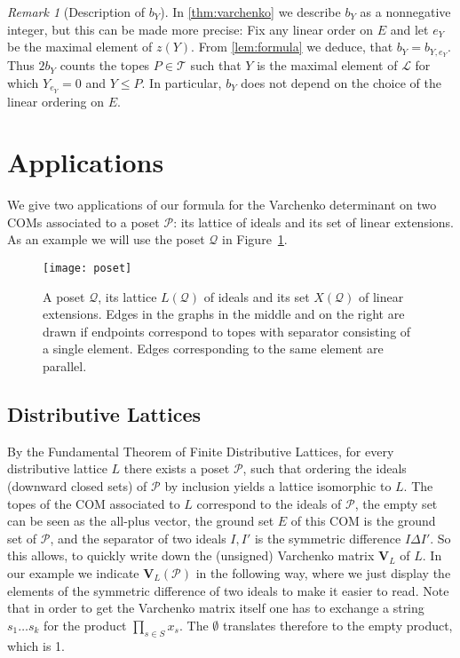 \documentclass[12pt]{amsart}
\def\Tscr{{\mathcal T}}
\theoremstyle{plain}
\numberwithin{Lemma}{\DefaultNumberTheoremWithin}
\numberwithin{Claim}{\DefaultNumberTheoremWithin}
\numberwithin{Theorem}{\DefaultNumberTheoremWithin}
\numberwithin{Corollary}{\DefaultNumberTheoremWithin}
\numberwithin{Proposition}{\DefaultNumberTheoremWithin}
\numberwithin{Conjecture}{\DefaultNumberTheoremWithin}
\numberwithin{Situation}{\DefaultNumberTheoremWithin}
\numberwithin{Note}{\DefaultNumberTheoremWithin}
\theoremstyle{definition}
\numberwithin{Definition}{\DefaultNumberTheoremWithin}
\theoremstyle{definition}
\numberwithin{Question}{\DefaultNumberTheoremWithin}
\theoremstyle{definition}
\numberwithin{Problem}{\DefaultNumberTheoremWithin}
\theoremstyle{remark} \newtheorem{Remark}{Remark}
\numberwithin{Remark}{\DefaultNumberTheoremWithin}
\theoremstyle{remark}
\numberwithin{Example}{\DefaultNumberTheoremWithin}
\numberwithin{Case}{Lemma}
\numberwithin{Step}{Lemma}
\begin{document}
\begin{Remark}[Description of $b_Y$]\label{note:bY}
In \ref{thm:varchenko} we describe $b_Y$ as a nonnegative integer, but this can be made more precise: Fix any linear order on $E$ and let $e_Y$ be the maximal element of $z(Y)$. From \ref{lem:formula} we deduce, that $b_Y = b_{Y,e_Y}$. Thus $2b_Y
$ counts the topes $P \in \Tscr$
such that $Y$ is the maximal element of $\mathcal{L}$ for which $Y_{e_Y} = 0$ and $Y \leq P$. In particular, $b_Y$ does not depend on the choice of the linear ordering on $E$.
\end{Remark}

\section{Applications}\label{sec:applications}
We give two applications of our formula for the Varchenko determinant on two COMs associated to a poset $\mathcal{P}$: its lattice of ideals and its set of linear extensions. As an example we will use the poset $\mathcal{Q}$ in Figure~\ref{fig:poset}.
 \begin{center}
 \begin{figure}
 \texttt{[image: poset]}
 \caption{A poset $\mathcal{Q}$, its lattice $L(\mathcal{Q})$ of ideals and its set $X(\mathcal{Q})$ of linear extensions. Edges in the graphs in the middle and on the right are drawn if endpoints correspond to topes with separator consisting of a single element. Edges corresponding to the same element are parallel.}\label{fig:poset}
  
 \end{figure}

 \end{center}

\subsection{Distributive Lattices}
By the Fundamental Theorem of Finite Distributive Lattices, for every distributive lattice $L$ there exists a poset $\mathcal{P}$, such that ordering the ideals (downward closed sets) of $\mathcal{P}$ by inclusion yields a lattice isomorphic to $L$. The topes of the COM associated to $L$ correspond to the ideals of $\mathcal{P}$, the empty set can be seen as the all-plus vector, the ground set $E$ of this COM is the ground set of $\mathcal{P}$, and the separator of two ideals $I,I'$ is the symmetric difference $I\Delta I'$. So this allows, to quickly write down the (unsigned) Varchenko matrix $\mathbf{V}_L$ of $L$. In our example we indicate $\mathbf{V}_L(\mathcal{P})$ in the following way, where we just display the elements of the symmetric difference of two ideals to make it easier to read. Note that in order to get the Varchenko matrix itself one has to exchange a string $s_1 \ldots s_k$ for the product $\prod_{s\in S}x_s$. The $\emptyset$ translates therefore to the empty product, which is 1.
\end{document}
